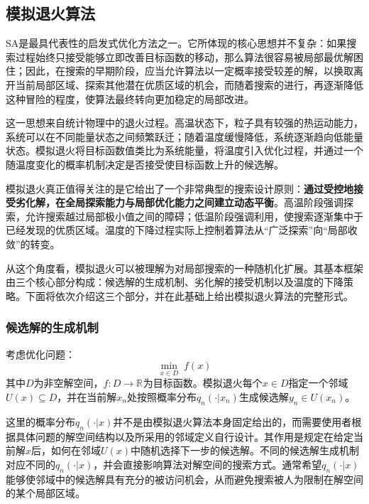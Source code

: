 \subsection{模拟退火算法}
\gls{SA}是最具代表性的启发式优化方法之一。它所体现的核心思想并不复杂：如果搜索过程始终只接受能够立即改善目标函数的移动，那么算法很容易被局部最优解困住；因此，在搜索的早期阶段，应当允许算法以一定概率接受较差的解，以换取离开当前局部区域、探索其他潜在优质区域的机会，而随着搜索的进行，再逐渐降低这种冒险的程度，使算法最终转向更加稳定的局部改进。\par
这一思想来自统计物理中的退火过程。高温状态下，粒子具有较强的热运动能力，系统可以在不同能量状态之间频繁跃迁；随着温度缓慢降低，系统逐渐趋向低能量状态。模拟退火将目标函数值类比为系统能量，将温度引入优化过程，并通过一个随温度变化的概率机制决定是否接受使目标函数上升的候选解。\par
模拟退火真正值得关注的是它给出了一个非常典型的搜索设计原则：\textbf{通过受控地接受劣化解，在全局探索能力与局部优化能力之间建立动态平衡}。高温阶段强调探索，允许搜索越过局部极小值之间的障碍；低温阶段强调利用，使搜索逐渐集中于已经发现的优质区域。温度的下降过程实际上控制着算法从“广泛探索”向“局部收敛”的转变。\par
从这个角度看，模拟退火可以被理解为对局部搜索的一种随机化扩展。其基本框架由三个核心部分构成：候选解的生成机制、劣化解的接受机制以及温度的下降策略。下面将依次介绍这三个部分，并在此基础上给出模拟退火算法的完整形式。
\subsubsection{候选解的生成机制}
考虑优化问题：
\begin{equation*}
	\min_{x\in D}\;f(x)
\end{equation*}
其中$D$为非空解空间，$f:D\to\mathbb{R}^{}$为目标函数。模拟退火每个$x\in D$指定一个邻域$U(x)\subseteq D$，并在当前解$x_n$处按照概率分布$q_n(\cdot|x_n)$生成候选解$y_n\in U(x_n)$。\par
这里的概率分布$q_n(\cdot|x)$并不是由模拟退火算法本身固定给出的，而需要使用者根据具体问题的解空间结构以及所采用的邻域定义自行设计。其作用是规定在给定当前解$x$后，如何在邻域$U(x)$中随机选择下一步的候选解。不同的候选解生成机制对应不同的$q_n(\cdot|x)$，并会直接影响算法对解空间的搜索方式。通常希望$q_n(\cdot|x)$能够使邻域中的候选解具有充分的被访问机会，从而避免搜索被人为限制在解空间的某个局部区域。
